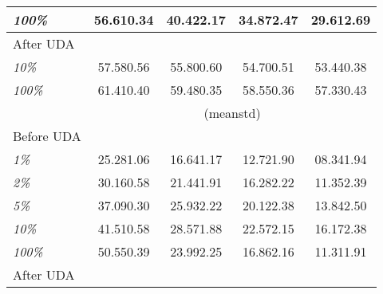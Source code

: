 \begin{table}[bt!]
{\begin{tabular}{l|cccc}
			\emph{100\%}            & 56.610.34                                                                                        & 40.422.17 & 34.872.47 & 29.612.69 \Tstrut  \\\hline
			After UDA               &                                                                                                       &                & \Tstrut                                  \\
			\emph{10\%}             & 57.580.56                                                                                        & 55.800.60 & 54.700.51 & 53.440.38 \Tstrut  \\
			\emph{100\%}            & 61.410.40                                                                                        & 59.480.35 & 58.550.36 & 57.330.43 \Tstrut  \\
			\hline
			                        & \multicolumn{4}{c}{ (meanstd)} \Tstrut \Bstrut                                                                           \\
			\hline
			Before UDA              &                                                                                                       &                & \Tstrut                                  \\
			\emph{1\%}              & 25.281.06                                                                                        & 16.641.17 & 12.721.90 & 08.341.94 \Tstrut  \\
			\emph{2\%}              & 30.160.58                                                                                        & 21.441.91 & 16.282.22 & 11.352.39 \Tstrut  \\
			\emph{5\%}              & 37.090.30                                                                                        & 25.932.22 & 20.122.38 & 13.842.50 \Tstrut  \\
			\emph{10\%}             & 41.510.58                                                                                        & 28.571.88 & 22.572.15 & 16.172.38 \Tstrut  \\
			\emph{100\%}            & 50.550.39                                                                                        & 23.992.25 & 16.862.16 & 11.311.91 \Tstrut  \\\hline
			After UDA               &                                                                                                       &                & \Tstrut                                  \\

\end{tabular}}
\end{table}
